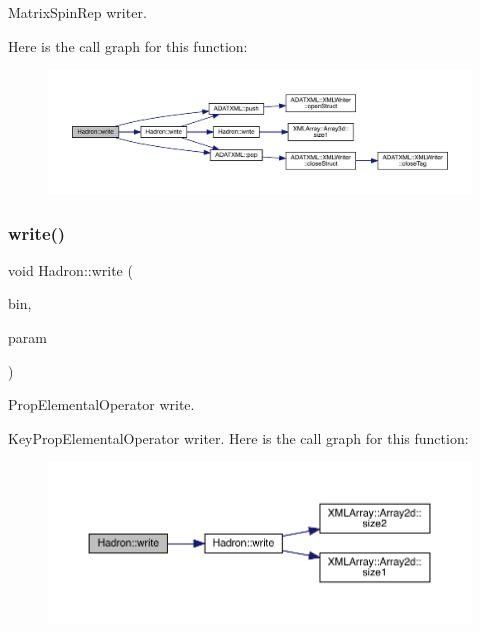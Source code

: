 Matrix\+Spin\+Rep writer. 

Here is the call graph for this function\+:
\nopagebreak
\begin{figure}[H]
\begin{center}
\leavevmode
\includegraphics[width=350pt]{d1/daf/namespaceHadron_a433908e65befd36f268196398b8469c7_cgraph}
\end{center}
\end{figure}
\mbox{\label{namespaceHadron_a2d77dd144d88ef6a060cca397fb32373}} 
\subsubsection{\texorpdfstring{write()}{write()}\hspace{0.1cm}{\footnotesize\ttfamily [20/95]}}
{\footnotesize\ttfamily void Hadron\+::write (\begin{DoxyParamCaption}\item[{\mbox{\hyperlink{classADATIO_1_1BinaryWriter}{Binary\+Writer}} \&}]{bin,  }\item[{const \mbox{\hyperlink{structHadron_1_1KeyPropElementalOperator__t}{Key\+Prop\+Elemental\+Operator\+\_\+t}} \&}]{param }\end{DoxyParamCaption})}



Prop\+Elemental\+Operator write. 

Key\+Prop\+Elemental\+Operator writer. Here is the call graph for this function\+:
\nopagebreak
\begin{figure}[H]
\begin{center}
\leavevmode
\includegraphics[width=350pt]{d1/daf/namespaceHadron_a2d77dd144d88ef6a060cca397fb32373_cgraph}
\end{center}
\end{figure}
\mbox{\label{namespaceHadron_a67e12d192d662851e588e9f3504ec45e}} 

